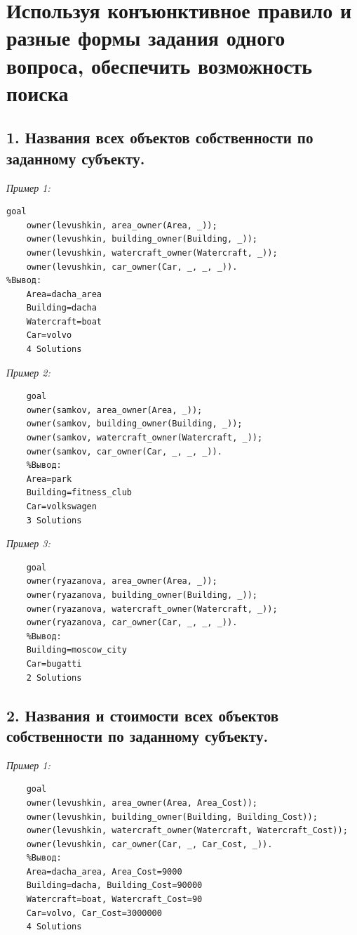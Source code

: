 \documentclass[a4paper,12pt]{article}
\begin{document}
	\newpage
	
	\section*{Используя конъюнктивное правило и разные формы задания одного вопроса, обеспечить возможность поиска}
	
	\subsection*{1. Названия всех объектов собственности по заданному субъекту.}
	
	\textit{Пример 1:}
	
	\begin{verbatim}
goal
	owner(levushkin, area_owner(Area, _));
	owner(levushkin, building_owner(Building, _));
	owner(levushkin, watercraft_owner(Watercraft, _));
	owner(levushkin, car_owner(Car, _, _, _)).
%Вывод:
	Area=dacha_area
	Building=dacha
	Watercraft=boat
	Car=volvo
	4 Solutions
	\end{verbatim}
	
	\textit{Пример 2:}
	
	\begin{verbatim}
	goal
	owner(samkov, area_owner(Area, _));
	owner(samkov, building_owner(Building, _));
	owner(samkov, watercraft_owner(Watercraft, _));
	owner(samkov, car_owner(Car, _, _, _)).
	%Вывод:
	Area=park
	Building=fitness_club
	Car=volkswagen
	3 Solutions
	\end{verbatim}
	
	\textit{Пример 3:}
	
	\begin{verbatim}
	goal
	owner(ryazanova, area_owner(Area, _));
	owner(ryazanova, building_owner(Building, _));
	owner(ryazanova, watercraft_owner(Watercraft, _));
	owner(ryazanova, car_owner(Car, _, _, _)).
	%Вывод:
	Building=moscow_city
	Car=bugatti
	2 Solutions
	\end{verbatim}
	
	\subsection*{2. Названия и стоимости всех объектов собственности по заданному субъекту.}
	
	\textit{Пример 1:}
	
	\begin{verbatim}
	goal
	owner(levushkin, area_owner(Area, Area_Cost));
	owner(levushkin, building_owner(Building, Building_Cost));
	owner(levushkin, watercraft_owner(Watercraft, Watercraft_Cost));
	owner(levushkin, car_owner(Car, _, Car_Cost, _)).
	%Вывод:
	Area=dacha_area, Area_Cost=9000
	Building=dacha, Building_Cost=90000
	Watercraft=boat, Watercraft_Cost=90
	Car=volvo, Car_Cost=3000000
	4 Solutions
	\end{verbatim}
	
\end{document}
